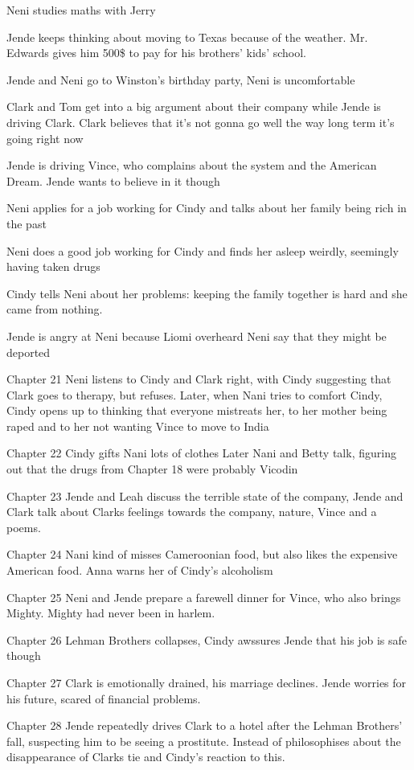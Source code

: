 \documentclass{article}
\begin{document}
\begin{description}
 \item[Chapter 12] Neni studies maths with Jerry
 \item[Chapter 13] Jende keeps thinking about moving to Texas because of the weather. Mr. Edwards gives him 500\$ to pay for his brothers' kids' school.
 \item[Chapter 14] Jende and Neni go to Winston's birthday party, Neni is uncomfortable
 \item[Chapter 15] Clark and Tom get into a big argument about their company while Jende is driving Clark. Clark believes that it's not gonna go well the way long term it's going right now
 \item[Chapter 16] Jende is driving Vince, who complains about the system and the American Dream. Jende wants to believe in it though
 \item[Chapter 17] Neni applies for a job working for Cindy and talks about her family being rich in the past
 \item[Chapter 18] Neni does a good job working for Cindy and finds her asleep weirdly, seemingly having taken drugs
 \item[Chapter 19] Cindy tells Neni about her problems: keeping the family together is hard and she came from nothing. 
 \item[Chapter 20] Jende is angry at Neni because Liomi overheard Neni say that they might be deported
 \item{Chapter 21} Neni listens to Cindy and Clark right, with Cindy suggesting that Clark goes to therapy, but refuses. Later, when Nani tries to comfort Cindy, Cindy opens up to thinking that everyone mistreats her, to her mother being raped and to her not wanting Vince to move to India
 \item{Chapter 22} Cindy gifts Nani lots of clothes Later Nani and Betty talk, figuring out that the drugs from Chapter 18 were probably Vicodin
 \item{Chapter 23} Jende and Leah discuss the terrible state of the company, Jende and Clark talk about Clarks feelings towards the company, nature, Vince and a poems.
 \item{Chapter 24} Nani kind of misses Cameroonian food, but also likes the expensive American food. Anna warns her of Cindy's alcoholism
 \item{Chapter 25} Neni and Jende prepare a farewell dinner for Vince, who also brings Mighty. Mighty had never been in harlem.
 \item{Chapter 26} Lehman Brothers collapses, Cindy awssures Jende that his job is safe though
 \item{Chapter 27} Clark is emotionally drained, his marriage declines. Jende worries for his future, scared of financial problems.
 \item{Chapter 28} Jende repeatedly drives Clark to a hotel after the Lehman Brothers' fall, suspecting him to be seeing a prostitute. Instead of philosophises about the disappearance of Clarks tie and Cindy's reaction to this.
\end{description}   
\end{document}
